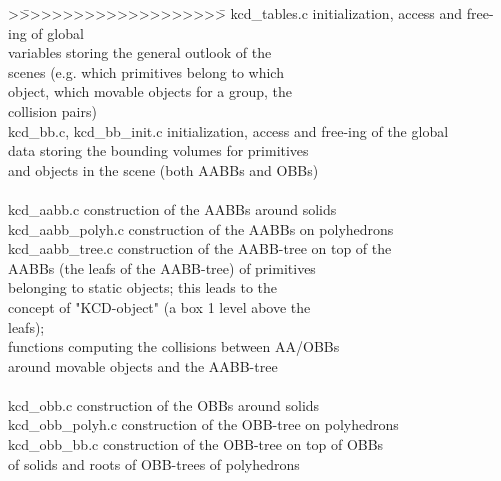 \begin{tabbing}
\vspace{-5mm}
>\=>>>>>>>>>>>>>>>>>>>\= \kill
\>kcd\_tables.c           \>    initialization, access and free-ing of global \\
\>\>                          variables storing the general outlook of the \\
\>\>                          scenes (e.g. which primitives belong to which \\
 \>\>                         object, which movable objects for a group, the \\
 \>\>                         collision pairs)\\
\> kcd\_bb.c, kcd\_bb\_init.c   \> initialization, access and free-ing of the global \\
\>\>                          data storing the bounding volumes for primitives \\
\>\>                          and objects in the scene (both AABBs and OBBs)\\
        \> \> \\
\> kcd\_aabb.c      \>           construction of the AABBs around solids\\
\> kcd\_aabb\_polyh.c    \>       construction of the AABBs on polyhedrons\\
\> kcd\_aabb\_tree.c    \>        construction of the AABB-tree on top of the\\
\>\>                          AABBs (the leafs of the AABB-tree) of primitives \\
\>\>                          belonging to static objects; this leads to the \\
\>\>                          concept of "KCD-object" (a box 1 level above the \\
\>\>                          leafs);\\
\>\>                          functions computing the collisions between AA/OBBs\\
\>\>                          around movable objects and the AABB-tree\\
\> \> \\
\> kcd\_obb.c    \>              construction of the OBBs around solids\\
\> kcd\_obb\_polyh.c    \>        construction of the OBB-tree on polyhedrons\\
\> kcd\_obb\_bb.c    \>           construction of the OBB-tree on top of OBBs\\
\>\>                          of solids and roots of OBB-trees of polyhedrons\\

\end{tabbing}
